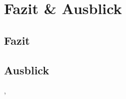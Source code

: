 \section{Fazit \& Ausblick}
\label{sec:schluss}

\subsection{Fazit}
\label{sec:fazit}


\subsection{Ausblick}
\label{sec:ausblick}

\cite{orwell}, 